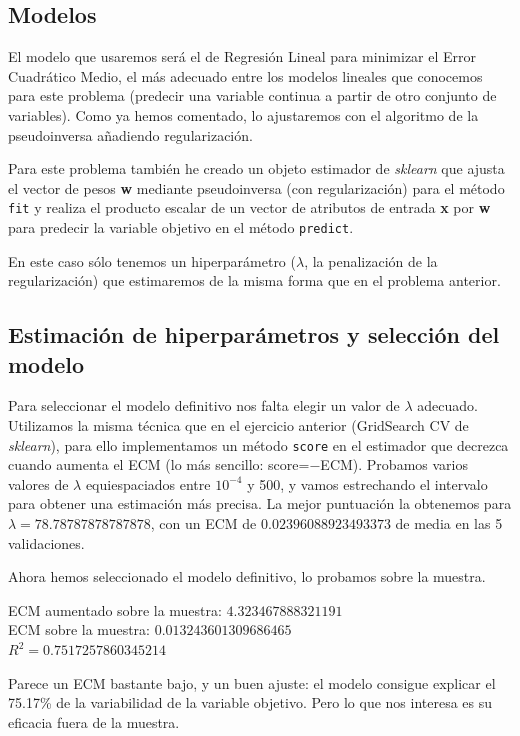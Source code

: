 \documentclass[a4]{article}
\begin{document}
\subsection{Modelos}

El modelo que usaremos será el de Regresión Lineal para minimizar el
Error Cuadrático Medio, el más adecuado entre los modelos lineales que
conocemos para este problema (predecir una variable continua a partir
de otro conjunto de variables). Como ya hemos comentado, lo
ajustaremos con el algoritmo de la pseudoinversa añadiendo
regularización.

Para este problema también he creado un objeto estimador de
\textit{sklearn} que ajusta el vector de pesos \textbf{w} mediante
pseudoinversa (con regularización) para el método \texttt{fit} y
realiza el producto escalar de un vector de atributos de entrada
\textbf{x} por \textbf{w} para predecir la variable objetivo en el
método \texttt{predict}.

En este caso sólo tenemos un hiperparámetro
($\lambda$, la penalización de la regularización) que estimaremos de
la misma forma que en el problema anterior.

\subsection{Estimación de hiperparámetros y selección del modelo}

Para seleccionar el modelo definitivo nos falta elegir un valor de
$\lambda$ adecuado. Utilizamos la misma técnica que en el ejercicio
anterior (GridSearch CV de \textit{sklearn}), para ello implementamos
un método \texttt{score} en el estimador que decrezca cuando aumenta
el ECM (lo más sencillo: score=$-$ECM). Probamos varios valores de
$\lambda$ equiespaciados entre $10^{-4}$ y 500, y vamos estrechando el
intervalo para obtener una estimación más precisa. La mejor puntuación
la obtenemos para $\lambda=78.78787878787878$, con un ECM de
$0.02396088923493373$ de media en las 5 validaciones.

Ahora hemos seleccionado el modelo definitivo, lo probamos sobre la
muestra.

ECM aumentado sobre la muestra: $4.323467888321191$ \\ 
ECM sobre la muestra: $0.013243601309686465$ \\
$R^2= 0.7517257860345214$

Parece un ECM bastante bajo, y un buen ajuste: el modelo consigue
explicar el 75.17\% de la variabilidad de la variable objetivo. Pero
lo que nos interesa es su eficacia fuera de la muestra.
\end{document}
